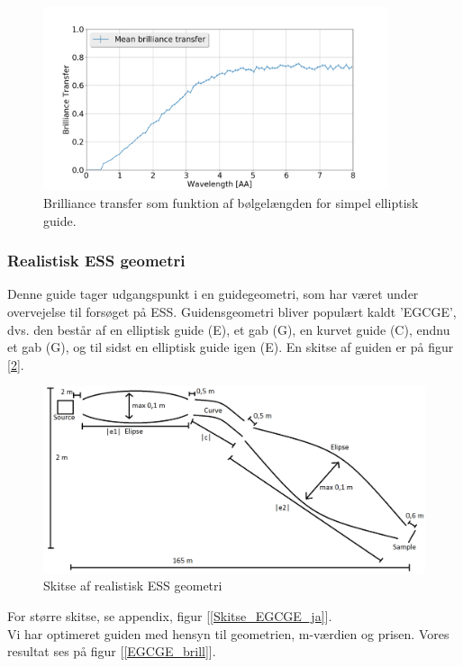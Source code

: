 \documentclass[12pt,oneside,a4paper]{article}
\begin{document}
{{{{{\begin{figure}[H]
\centering
\includegraphics[width=0.9\textwidth]{optimized_mean_4.png}
\caption{Brilliance transfer som funktion af bølgelængden for simpel elliptisk guide.} \label{simpel_guide}
\end{figure}


\subsubsection{Realistisk ESS geometri}
Denne guide tager udgangspunkt i en guidegeometri, som har været under overvejelse til forsøget på ESS. Guidensgeometri bliver populært kaldt 'EGCGE', dvs. den består af en elliptisk guide (E), et gab (G), en kurvet guide (C), endnu et gab (G), og til sidst en elliptisk guide igen (E). En skitse af guiden er på figur [\ref{EGCGE}].

\begin{figure}[H]
\centering
\includegraphics[width=1\textwidth]{EGCGE.png}
\caption{Skitse af realistisk ESS geometri} \label{EGCGE}
\end{figure}
For større skitse, se appendix, figur [\ref{Skitse_EGCGE_ja}]. \\
Vi har optimeret guiden med hensyn til geometrien, m-værdien og prisen. Vores resultat ses på figur [\ref{EGCGE_brill}].

}}}}}
\end{document}
